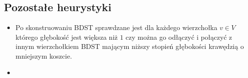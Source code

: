 \subsection{Pozostałe heurystyki}
\begin{itemize}
    \item Po skonstruowaniu BDST sprawdzane jest dla każdego wierzchołka $v \in V$ którego głębokość jest większa niż $1$ czy można go odłączyć i połączyć z innym wierzchołkiem BDST mającym niższy stopień głębokości krawędzią o mniejszym koszcie.
    \item 
\end{itemize}
